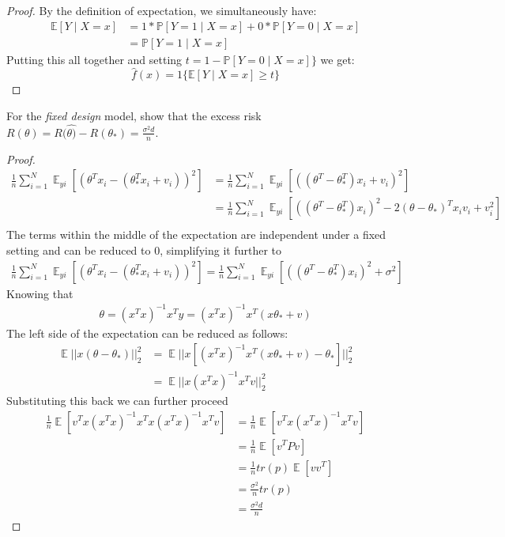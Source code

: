 \begin{proof}
\noindent
By the definition of expectation, we simultaneously have:
\begin{align*}
\mathbb{E}[Y \mid X = x] &= 1*\mathbb{P}[Y=1 \mid X=x] + 0*\mathbb{P}[Y=0 \mid X=x] \\
&= \mathbb{P}[Y=1 \mid X=x]
\end{align*}
Putting this all together and setting $t = 1 - \mathbb{P}[Y=0 \mid X=x]\}$ we get:
$$\hat{f}(x) = 1\{\mathbb{E}[Y \mid X = x] \geq t \}$$
\end{proof}

\begin{exercise}
    For the \emph{fixed design} model, show that the excess risk  $R(\theta) = R(\hat{\theta)} - R(\theta_{*}) = \frac{\sigma^{2}d}{n}$.
\end{exercise}
\begin{proof} 
\begin{align*}
\frac{1}{n}\sum_{i=1}^{N}\mathop{{}\mathbb{E}}_{yi}[(\theta^{T}x_{i} - (\theta_{*}^{T}x_{i}+v_{i}))^{2}] &= \frac{1}{n}\sum_{i=1}^{N}\mathop{{}\mathbb{E}}_{yi}[((\theta^{T} - \theta_{*}^{T})x_{i}+v_{i})^{2}] \\
&= \frac{1}{n}\sum_{i=1}^{N}\mathop{{}\mathbb{E}}_{yi}[((\theta^{T} - \theta_{*}^{T})x_{i})^{2}-2(\theta - \theta_{*})^{T}x_{i}v_{i}+v_{i}^{2}] \\
\end{align*}
The terms within the middle of the expectation are independent under a fixed setting and can be reduced to $0$, simplifying it further to \\
\begin{align*}
 \frac{1}{n}\sum_{i=1}^{N}\mathop{{}\mathbb{E}}_{yi}[(\theta^{T}x_{i} - (\theta_{*}^{T}x_{i}+v_{i}))^{2}] = \frac{1}{n}\sum_{i=1}^{N}\mathop{{}\mathbb{E}}_{yi}[((\theta^{T} - \theta_{*}^{T})x_{i})^{2}+\sigma^{2}] 
\end{align*}
Knowing that 
\begin{align*}
    \theta = (x^{T}x)^{-1}x^{T}y = (x^{T}x)^{-1}x^{T}(x\theta_{*}+v)
\end{align*}
The left side of the expectation can be reduced as follows:
\begin{align*}
\mathop{{}\mathbb{E}}||x(\theta-\theta_{*})||_{2}^{2} &=\mathop{{}\mathbb{E}}||x[(x^{T}x)^{-1}x^{T}(x\theta_{*}+v)-\theta_{*}]||_{2}^{2} \\
&=\mathop{{}\mathbb{E}}||x(x^{T}x)^{-1}x^{T}v||_{2}^{2}
\end{align*}
Substituting this back we can further proceed
\begin{align*}
\frac{1}{n}\mathop{{}\mathbb{E}}[v^{T}x(x^{T}x)^{-1}x^{T}x(x^{T}x)^{-1}x^{T}v] &= \frac{1}{n}\mathop{{}\mathbb{E}}[v^{T}x(x^{T}x)^{-1}x^{T}v] \\ 
&= \frac{1}{n}\mathop{{}\mathbb{E}}[v^{T}Pv] \\
&= \frac{1}{n}tr(p)\mathop{{}\mathbb{E}}[vv^{T}] \\ 
&= \frac{\sigma^{2}}{n}tr(p) \\
&= \frac{\sigma^{2}d}{n}
\end{align*}
\end{proof}



